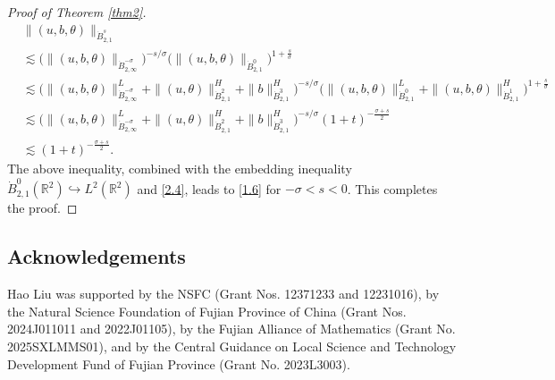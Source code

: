 \documentclass[reqno]{amsart}
\begin{document}
\begin{proof}[Proof of Theorem \ref{thm2}]
\begin{align*}
&\|(u,b,\theta)\|_{\dot{B}^{s}_{2,1}} \\
&\lesssim \Big(\|(u,b,\theta)\|_{\dot{B}^{-\sigma}_{2,\infty}}
 \Big)^{-s/\sigma}\Big(\|(u,b,\theta)\|_{\dot{B}^{0}_{2,1}}
  \Big)^{1+\frac{s}{\sigma}}\\
&\lesssim \Big(\|(u,b,\theta)\|^L_{\dot{B}^{-\sigma}_{2,\infty}}
 +\|(u,\theta)\|^H_{\dot{B}^{2}_{2,1}}+\|b\|^H_{\dot{B}^{3}_{2,1}}\Big)^{-s/\sigma}
  \Big(\|(u,b,\theta)\|_{\dot{B}^{0}_{2,1}}^L+\|(u,b,\theta)\|_{\dot{B}^{1}_{2,1}}^H
  \Big)^{1+\frac{s}{\sigma}}\\
&\lesssim \Big(\|(u,b,\theta)\|^L_{\dot{B}^{-\sigma}_{2,\infty}}+\|(u,\theta)
 \|^H_{\dot{B}^{2}_{2,1}}+\|b\|^H_{\dot{B}^{3}_{2,1}}\Big)^{-s/\sigma}
 (1+t)^{-\frac{\sigma+s}{2}}\\
&\lesssim (1+t)^{-\frac{\sigma+s}{2}}.
\end{align*}
The above inequality, combined with the embedding inequality 
$\dot{B}^{0}_{2,1}(\mathbb{R}^2)\hookrightarrow L^2(\mathbb{R}^2)$ and \eqref{2.4}, 
leads to \eqref{1.6} for $-\sigma<s<0$.
This completes the proof.
\end{proof}

\subsection*{Acknowledgements} 
 Hao Liu was supported by the NSFC (Grant Nos. 12371233 and 12231016),
by the Natural Science Foundation of Fujian Province of China 
(Grant Nos. 2024J011011 and 2022J01105), by the  Fujian Alliance of Mathematics 
(Grant No. 2025SXLMMS01),  and by the Central Guidance on Local Science and 
Technology Development Fund of Fujian Province (Grant No. 2023L3003).
\end{document}
